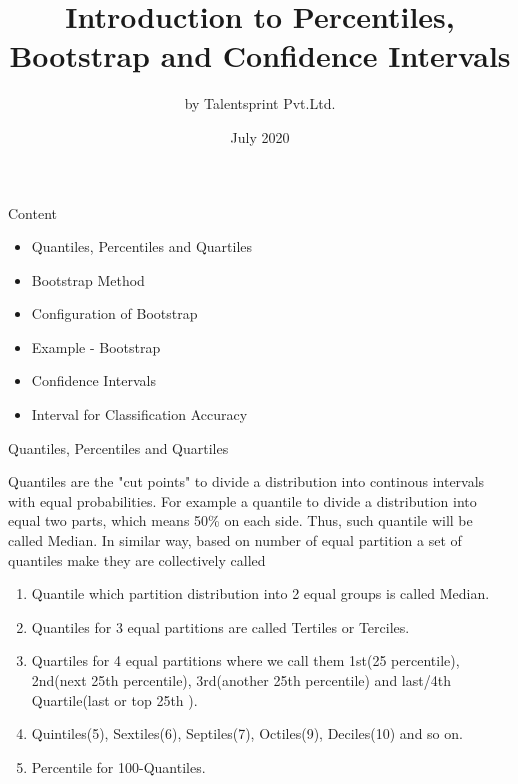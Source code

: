 \documentclass{beamer}
\title{Introduction to Percentiles, Bootstrap and Confidence Intervals}
\author{by Talentsprint Pvt.Ltd.}
\date{July 2020}
\begin{document}
\maketitle
\begin{frame}{Content}
	\begin{itemize}
		\item Quantiles, Percentiles and Quartiles
		\item Bootstrap Method
		\item Configuration of Bootstrap
		\item Example - Bootstrap
		\item Confidence Intervals
		\item Interval for Classification Accuracy
	\end{itemize}
\end{frame}

\begin{frame}{Quantiles, Percentiles and Quartiles}
\begin{flushleft}
	Quantiles are the "cut points" to divide a distribution into continous intervals with equal probabilities. For example a quantile to divide a distribution into equal two parts, which means 50\% on each side. Thus, such quantile will be called Median. In similar way, based on number of equal partition a set of quantiles make they are collectively called
\\
\end{flushleft}
	\begin{enumerate}
		\item Quantile which partition distribution into 2 equal groups is called Median.
		\item Quantiles for 3 equal partitions are called Tertiles or Terciles.
		\item Quartiles for 4 equal partitions where we call them 1st(25 percentile), 2nd(next 25th percentile), 3rd(another 25th percentile) and last/4th Quartile(last or top 25th ).
		\item Quintiles(5), Sextiles(6), Septiles(7), Octiles(9), Deciles(10) and so on.
		\item Percentile for 100-Quantiles.
	\end{enumerate}
\begin{flushleft}
	
\end{flushleft}
\end{frame}
\end{document}
